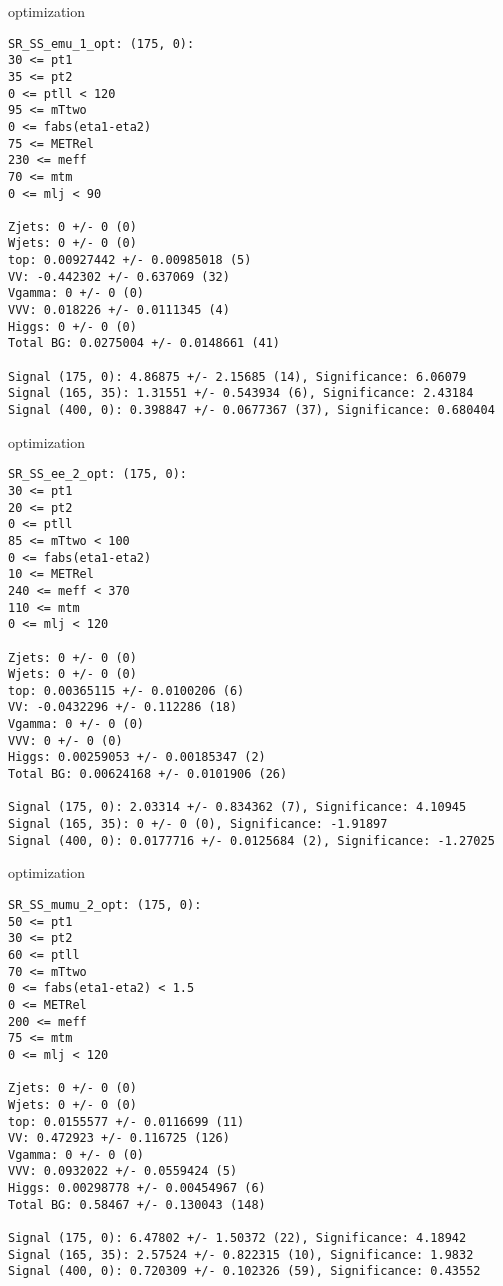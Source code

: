 \begin{frame}[fragile]{optimization}
\tiny
\begin{verbatim}
SR_SS_emu_1_opt: (175, 0):
30 <= pt1
35 <= pt2
0 <= ptll < 120
95 <= mTtwo
0 <= fabs(eta1-eta2)
75 <= METRel
230 <= meff
70 <= mtm
0 <= mlj < 90

Zjets: 0 +/- 0 (0)
Wjets: 0 +/- 0 (0)
top: 0.00927442 +/- 0.00985018 (5)
VV: -0.442302 +/- 0.637069 (32)
Vgamma: 0 +/- 0 (0)
VVV: 0.018226 +/- 0.0111345 (4)
Higgs: 0 +/- 0 (0)
Total BG: 0.0275004 +/- 0.0148661 (41)

Signal (175, 0): 4.86875 +/- 2.15685 (14), Significance: 6.06079
Signal (165, 35): 1.31551 +/- 0.543934 (6), Significance: 2.43184
Signal (400, 0): 0.398847 +/- 0.0677367 (37), Significance: 0.680404
\end{verbatim}
\end{frame}

\begin{frame}[fragile]{optimization}
\tiny
\begin{verbatim}
SR_SS_ee_2_opt: (175, 0):
30 <= pt1
20 <= pt2
0 <= ptll
85 <= mTtwo < 100
0 <= fabs(eta1-eta2)
10 <= METRel
240 <= meff < 370
110 <= mtm
0 <= mlj < 120

Zjets: 0 +/- 0 (0)
Wjets: 0 +/- 0 (0)
top: 0.00365115 +/- 0.0100206 (6)
VV: -0.0432296 +/- 0.112286 (18)
Vgamma: 0 +/- 0 (0)
VVV: 0 +/- 0 (0)
Higgs: 0.00259053 +/- 0.00185347 (2)
Total BG: 0.00624168 +/- 0.0101906 (26)

Signal (175, 0): 2.03314 +/- 0.834362 (7), Significance: 4.10945
Signal (165, 35): 0 +/- 0 (0), Significance: -1.91897
Signal (400, 0): 0.0177716 +/- 0.0125684 (2), Significance: -1.27025
\end{verbatim}
\end{frame}

\begin{frame}[fragile]{optimization}
\tiny
\begin{verbatim}
SR_SS_mumu_2_opt: (175, 0):
50 <= pt1
30 <= pt2
60 <= ptll
70 <= mTtwo
0 <= fabs(eta1-eta2) < 1.5
0 <= METRel
200 <= meff
75 <= mtm
0 <= mlj < 120

Zjets: 0 +/- 0 (0)
Wjets: 0 +/- 0 (0)
top: 0.0155577 +/- 0.0116699 (11)
VV: 0.472923 +/- 0.116725 (126)
Vgamma: 0 +/- 0 (0)
VVV: 0.0932022 +/- 0.0559424 (5)
Higgs: 0.00298778 +/- 0.00454967 (6)
Total BG: 0.58467 +/- 0.130043 (148)

Signal (175, 0): 6.47802 +/- 1.50372 (22), Significance: 4.18942
Signal (165, 35): 2.57524 +/- 0.822315 (10), Significance: 1.9832
Signal (400, 0): 0.720309 +/- 0.102326 (59), Significance: 0.43552
\end{verbatim}
\end{frame}

